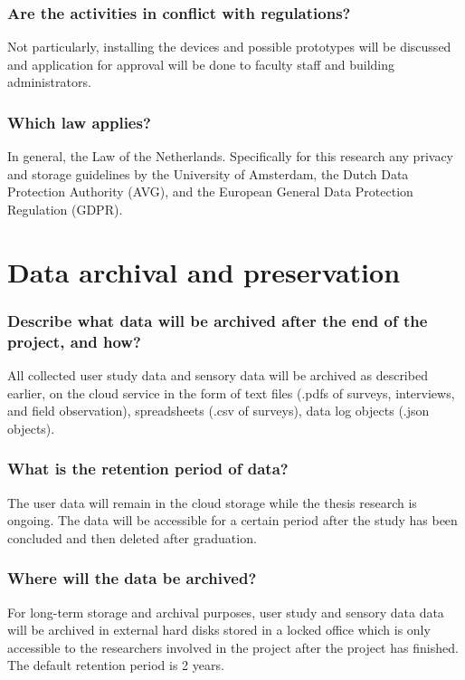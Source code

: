 \documentclass[a4paper]{article}
\begin{document}
\subsubsection{Are the activities in conflict with regulations?}

Not particularly, installing the devices and possible prototypes will be discussed and application for approval will be done to faculty staff and building administrators.

\subsubsection{Which law applies?}

In general, the Law of the Netherlands. Specifically for this research any privacy and storage guidelines by the University of Amsterdam, the  Dutch Data Protection Authority (AVG), and the European General Data Protection Regulation (GDPR).

\section{Data archival and preservation}

\subsubsection{Describe what data will be archived after the end of the project, and how?}

All collected user study data and sensory data will be archived as described earlier, on the cloud service in the form of text files (.pdfs of surveys, interviews, and field observation), spreadsheets (.csv of surveys), data log objects (.json objects).

\subsubsection{What is the retention period of data?}

The user data will remain in the cloud storage while the thesis research is ongoing. The data will be accessible for a certain period after the study has been concluded and then deleted after graduation.

\subsubsection{Where will the data be archived?}

For long-term storage and archival purposes, user study and sensory data data will be archived in external hard disks stored in a locked office which is only accessible to the researchers involved in the project after the project has finished. The default retention period is 2 years.
\end{document}
